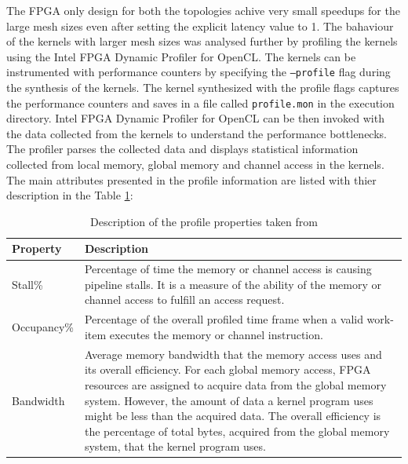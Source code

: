The FPGA only design for both the topologies achive very small speedups for the large mesh sizes
even after setting the explicit latency value to 1. The bahaviour of the kernels with larger mesh
sizes was analysed further by profiling the kernels using the Intel FPGA Dynamic Profiler for OpenCL.
The kernels can be instrumented with performance counters by specifying the \texttt{--profile} flag
during the synthesis of the kernels. The kernel synthesized with the profile flags captures the
performance counters and saves in a file called \texttt{profile.mon} in the execution directory.
Intel FPGA Dynamic Profiler for OpenCL can be then invoked with the data collected from the
kernels to understand the performance bottlenecks. The profiler parses the collected data and
displays statistical information collected from local memory, global memory and channel
access in the kernels. The main attributes presented in the profile information are
listed with thier description in the Table \ref{tab:profile_descr}:
\begin{table}[ht]%
    \centering
    \caption{Description of the profile properties taken from \cite{noauthor_intel_2019}}
    \label{tab:profile_descr}
    \begin{tabular}{lp{11cm}}
    \textbf{Property} & \textbf{Description} \\
    \hline
    Stall\% & Percentage of time the memory or channel
    access is causing pipeline stalls. It is a measure of the ability
    of the memory or channel access to fulfill an access request. \\
    \hline
    Occupancy\% & Percentage of the overall profiled time frame
    when a valid work-item executes the memory or channel instruction. \\
    \hline
    Bandwidth & Average memory bandwidth that the memory access
    uses and its overall efficiency. For each global memory access,
    FPGA resources are assigned to acquire data from the global
    memory system. However, the amount of data a kernel program
    uses might be less than the acquired data. The overall
    efficiency is the percentage of total bytes, acquired
    from the global memory system, that the kernel program uses.\\
    \hline
    \end{tabular}%
\end{table}

